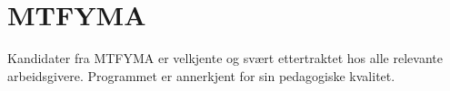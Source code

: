 \section{MTFYMA}
Kandidater fra MTFYMA er velkjente og svært ettertraktet hos alle relevante
arbeidsgivere. 
Programmet er annerkjent for sin pedagogiske kvalitet.